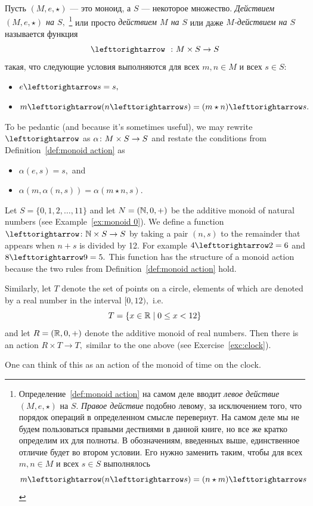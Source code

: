 \documentclass[CT4S-EN-RU]{subfiles}
\begin{document}
\begin{definitionRUS}\label{def:monoid action}
Пусть $(M,e,\star)$ — это моноид, а $S$ — некоторое множество. {\em Действием $(M,e,\star)$ на $S,$}%
\footnote{Определение~\ref{def:monoid action} на самом деле вводит {\em левое действие} $(M,e,\star)$ на $S.$ {\em Правое действие} подобно левому, за исключением того, что порядок операций в определенном смысле перевернут. На самом деле мы не будем пользоваться правыми дествиями в данной книге, но все же кратко определим их для полноты. В обозначениям, введенных выше, единственное отличие будет во втором условии. Его нужно заменить таким, чтобы для всех $m,n\in M$ и всех $s\in S$ выполнялось
$$m\acts(n\acts s)=(n\star m)\acts s$$}
или просто {\em действием $M$ на $S$} или даже {\em $M$-действием на $S$} называется функция $$\acts\;\;\taking M\times S\to S$$ такая, что следующие условия выполняются для всех $m,n\in M$ и всех $s\in S$:
\begin{itemize}
\item $e\acts s=s,$
\item $m\acts(n\acts s)=(m\star n)\acts s.$
\end{itemize}
\end{definitionRUS}

\begin{remarkENG}\label{rmk:monoid action}
To be pedantic (and because it's sometimes useful), we may rewrite $\acts$ as $\alpha\colon M\times S\rightarrow S$ and restate the conditions from Definition~\ref{def:monoid action} as
\begin{itemize}
\item $\alpha(e,s)=s,$ and
\item $\alpha(m,\alpha(n,s))=\alpha(m\star n,s).$
\end{itemize}
\end{remarkENG}

\begin{remarkRUS}\label{rmk:monoid action}
\end{remarkRUS}

\begin{exampleENG}\label{ex:clocks}
Let $S=\{0,1,2,\ldots,11\}$ and let $N=({\mathbb N},0,+)$ be the additive monoid of natural numbers (see Example~\ref{ex:monoid 0}).  We define a function $\acts\taking\NN\times S\to S$ by taking a pair $(n,s)$ to the remainder that appears when $n+s$ is divided by 12. For example $4\acts 2=6$ and $8\acts 9 = 5.$ This function has the structure of a monoid action because the two rules from Definition~\ref{def:monoid action} hold.

Similarly, let $T$ denote the set of points on a circle, elements of which are denoted by a real number in the interval $[0,12),$ i.e. $$T=\{x\in{\mathbb R}{\;|\;}0\leq x< 12\}$$ and let $R=({\mathbb R},0,+)$ denote the additive monoid of real numbers. Then there is an action $R\times T\to T,$ similar to the one above (see Exercise~\ref{exc:clock}).

One can think of this as an action of the monoid of time on the clock.
\end{exampleENG}
\end{document}
